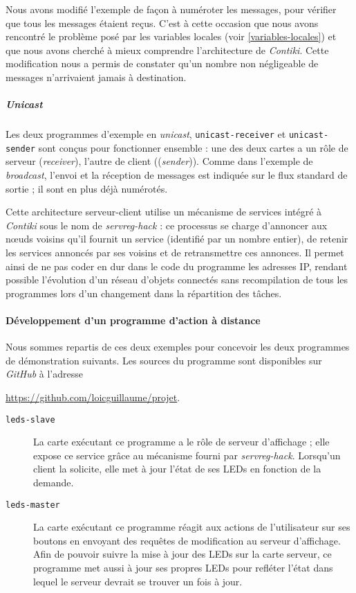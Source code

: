 Nous avons modifié l’exemple de façon à numéroter les messages, pour vérifier que tous les messages étaient reçus.
C’est à cette occasion que nous avons rencontré le problème posé par les variables locales (voir \cref{variables-locales}) et que nous avons cherché à mieux comprendre l’architecture de \emph{Contiki}.
Cette modification nous a permis de constater qu’un nombre non négligeable de messages n’arrivaient jamais à destination.

\subparagraph{\textit{Unicast}}

Les deux programmes d’exemple en \textit{unicast}, \texttt{unicast-receiver} et \texttt{unicast-sender} sont conçus pour fonctionner ensemble : une des deux cartes a un rôle de serveur (\textit{receiver}), l’autre de client ((\textit{sender})).
Comme dans l’exemple de \textit{broadcast}, l’envoi et la réception de messages est indiquée sur le flux standard de sortie ; il sont en plus déjà numérotés.

Cette architecture serveur-client utilise un mécanisme de services intégré à \emph{Contiki} sous le nom de \emph{servreg-hack}  : ce processus se charge d’annoncer aux nœuds voisins qu’il fournit un service (identifié par un nombre entier), de retenir les services annoncés par ses voisins et de retransmettre ces annonces.
Il permet ainsi de ne pas coder en dur dans le code du programme les adresses IP, rendant possible l’évolution d’un réseau d’objets connectés sans recompilation de tous les programmes lors d’un changement dans la répartition des tâches.

\paragraph{Développement d’un programme d’action à distance}

Nous sommes repartis de ces deux exemples pour concevoir les deux programmes de démonstration suivants. Les sources du programme sont disponibles sur \emph{GitHub} à l’adresse
\begin{center}
\url{https://github.com/loicguillaume/projet}.
\end{center}

\begin{description}
	\item[\texttt{leds-slave}]
		La carte exécutant ce programme a le rôle de serveur d’affichage ; elle expose ce service grâce au mécanisme fourni par \emph{servreg-hack}.
		Lorsqu’un client la solicite, elle met à jour l’état de ses LEDs en fonction de la demande.
	\item[\texttt{leds-master}]
		La carte exécutant ce programme réagit aux actions de l’utilisateur sur ses boutons en envoyant des requêtes de modification au serveur d’affichage.
		Afin de pouvoir suivre la mise à jour des LEDs sur la carte serveur, ce programme met aussi à jour ses propres LEDs pour refléter l’état dans lequel le serveur devrait se trouver un fois à jour.
\end{description}

